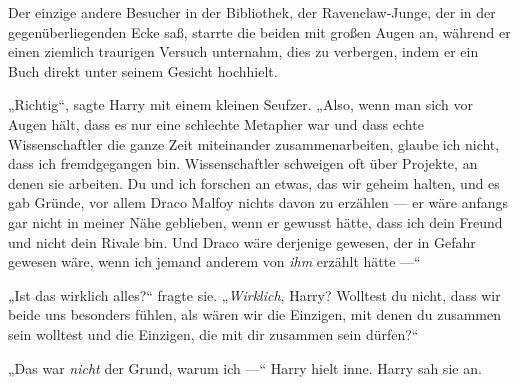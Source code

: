 Der einzige andere Besucher in der Bibliothek, der Ravenclaw-Junge, der in der gegenüberliegenden Ecke saß, starrte die beiden mit großen Augen an, während er einen ziemlich traurigen Versuch unternahm, dies zu verbergen, indem er ein Buch direkt unter seinem Gesicht hochhielt.

„Richtig“, sagte Harry mit einem kleinen Seufzer.
„Also, wenn man sich vor Augen hält, dass es nur eine schlechte Metapher war und dass echte Wissenschaftler die ganze Zeit miteinander zusammenarbeiten, glaube ich nicht, dass ich fremdgegangen bin. Wissenschaftler schweigen oft über Projekte, an denen sie arbeiten. Du und ich forschen an etwas, das wir geheim halten, und es gab Gründe, vor allem Draco Malfoy nichts davon zu erzählen — er wäre anfangs gar nicht in meiner Nähe geblieben, wenn er gewusst hätte, dass ich dein Freund und nicht dein Rivale bin. Und Draco wäre derjenige gewesen, der in Gefahr gewesen wäre, wenn ich jemand anderem von \emph{ihm} erzählt hätte —“

„Ist das wirklich alles?“ fragte sie.
„\emph{Wirklich}, Harry? Wolltest du nicht, dass wir beide uns besonders fühlen, als wären wir die Einzigen, mit denen du zusammen sein wolltest und die Einzigen, die mit dir zusammen sein dürfen?“



„Das war \emph{nicht} der Grund, warum ich —“ Harry hielt inne. Harry sah sie an.

